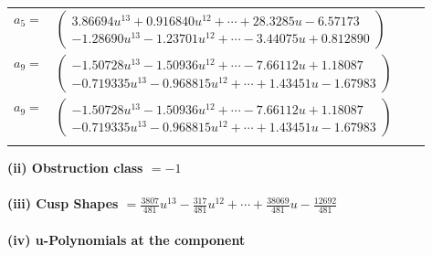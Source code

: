 \documentclass[1p]{elsarticle_modified}
\theoremstyle{definition}
\begin{document}
\begin{tabular}{m{7pt} m{180pt} m{7pt} m{180pt} }
\flushright $a_{5}=$&$\begin{pmatrix}3.86694 u^{13}+0.916840 u^{12}+\cdots+28.3285 u-6.57173\\-1.28690 u^{13}-1.23701 u^{12}+\cdots-3.44075 u+0.812890\end{pmatrix}$ \\
\flushright $a_{9}=$&$\begin{pmatrix}-1.50728 u^{13}-1.50936 u^{12}+\cdots-7.66112 u+1.18087\\-0.719335 u^{13}-0.968815 u^{12}+\cdots+1.43451 u-1.67983\end{pmatrix}$\\ \flushright $a_{9}=$&$\begin{pmatrix}-1.50728 u^{13}-1.50936 u^{12}+\cdots-7.66112 u+1.18087\\-0.719335 u^{13}-0.968815 u^{12}+\cdots+1.43451 u-1.67983\end{pmatrix}$\\&\end{tabular}
\flushleft \textbf{(ii) Obstruction class $= -1$}\\~\\
\flushleft \textbf{(iii) Cusp Shapes $= \frac{3807}{481} u^{13}-\frac{317}{481} u^{12}+\cdots+\frac{38069}{481} u-\frac{12692}{481}$}\\~\\
\newpage\renewcommand{\arraystretch}{1}
\flushleft \textbf{(iv) u-Polynomials at the component}\newline \\
\end{document}

